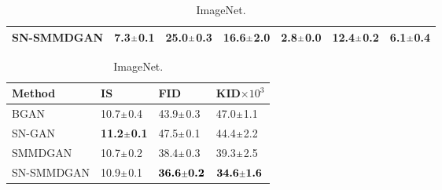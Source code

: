 \documentclass{article}
\begin{document}
\begin{table}[ht]
\begin{subtable}[t]{\linewidth}
\begin{tabular}{lllllll}
SN-SMMDGAN   &     \textbf{7.3$\mathsmaller{\pm}$0.1}&     \textbf{25.0$\mathsmaller{\pm}$0.3}&    \textbf{16.6$\mathsmaller{\pm}$2.0} &             2.8$\mathsmaller{\pm}$0.0 &     \textbf{12.4$\mathsmaller{\pm}$0.2}&  \textbf{\phantom{0}6.1$\mathsmaller{\pm}$0.4} \\
\bottomrule
\end{tabular}
   \end{subtable}
  \begin{subtable}[t]{\linewidth}
    \centering
    \caption{ImageNet.}
    \label{tab:imagenet_scores}
    \begin{tabular}{llll}
\toprule
Method &                                     IS &                                    FID &                       KID$\times 10^3$ \\
\midrule
BGAN       &             10.7$\mathsmaller{\pm}$0.4 &             43.9$\mathsmaller{\pm}$0.3 &             47.0$\mathsmaller{\pm}$1.1 \\
SN-GAN     &             \textbf{11.2$\mathsmaller{\pm}$0.1} &             47.5$\mathsmaller{\pm}$0.1 &             44.4$\mathsmaller{\pm}$2.2 \\
SMMDGAN    &             10.7$\mathsmaller{\pm}$0.2 &             38.4$\mathsmaller{\pm}$0.3 &             39.3$\mathsmaller{\pm}$2.5 \\
SN-SMMDGAN & 10.9$\mathsmaller{\pm}$0.1 &  $\textbf{36.6$\mathsmaller{\pm}$0.2}$ &  $\textbf{34.6$\mathsmaller{\pm}$1.6}$ \\
\bottomrule
\end{tabular}
   \end{subtable}
\end{table}
\end{document}
